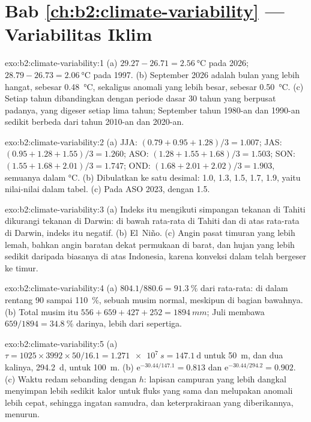 \section*{Bab \ref{ch:b2:climate-variability} --- Variabilitas Iklim}

\begin{solution}{exo:b2:climate-variability:1}
(a) $29.27 - 26.71 = \qty{2.56}{\celsius}$ pada 2026; $28.79 - 26.73 = \qty{2.06}{\celsius}$ pada 1997.
(b) September 2026 adalah bulan yang lebih hangat, sebesar \qty{0.48}{\celsius}, sekaligus anomali yang lebih besar, sebesar
\qty{0.50}{\celsius}. (c) Setiap tahun dibandingkan dengan periode dasar 30 tahun yang berpusat padanya, yang digeser
setiap lima tahun;  September tahun 1980-an dan 1990-an sedikit berbeda dari 
tahun 2010-an dan 2020-an.
\end{solution}

\begin{solution}{exo:b2:climate-variability:2}
(a) JJA: $(0.79 + 0.95 + 1.28)/3 = 1.007$; JAS: $(0.95 + 1.28 + 1.55)/3 = 1.260$; ASO: $(1.28 +
1.55 + 1.68)/3 = 1.503$; SON: $(1.55 + 1.68 + 2.01)/3 = 1.747$; OND: $(1.68 + 2.01 + 2.02)/3 =
1.903$, semuanya dalam \unit{\celsius}. (b) Dibulatkan ke satu desimal: 1.0, 1.3, 1.5, 1.7, 1.9, yaitu nilai-nilai
dalam tabel. (c) Pada ASO 2023, dengan 1.5.
\end{solution}

\begin{solution}{exo:b2:climate-variability:3}
(a) Indeks itu mengikuti simpangan tekanan di Tahiti dikurangi tekanan di Darwin: di bawah rata-rata
di Tahiti dan di atas rata-rata di Darwin, indeks itu negatif. (b) El~Niño. (c) Angin pasat timuran yang lebih lemah, bahkan
angin baratan dekat permukaan di barat, dan hujan yang lebih sedikit daripada biasanya di atas Indonesia, karena
konveksi dalam telah bergeser ke timur.
\end{solution}

\begin{solution}{exo:b2:climate-variability:4}
(a) $804.1/880.6 = \qty{91.3}{\percent}$ dari rata-rata: di dalam rentang 90 sampai \qty{110}{\percent}, sebuah
musim normal, meskipun di bagian bawahnya. (b) Total musim itu $556 + 659 + 427 + 252 =
\qty{1894}{mm}$; Juli membawa $659/1894 = \qty{34.8}{\percent}$ darinya, lebih dari sepertiga.
\end{solution}

\begin{solution}{exo:b2:climate-variability:5}
(a) $\tau = 1025 \times 3992 \times 50/16.1 = \qty{1.271e7}{s} = \qty{147.1}{\day}$ untuk
\qty{50}{m}, dan dua kalinya, \qty{294.2}{\day}, untuk \qty{100}{m}. (b) $\mathrm{e}^{-30.44/147.1} =
0.813$ dan $\mathrm{e}^{-30.44/294.2} = 0.902$. (c) Waktu redam sebanding dengan $h$: lapisan
campuran yang lebih dangkal menyimpan lebih sedikit kalor untuk fluks yang sama dan melupakan anomali lebih cepat, sehingga
ingatan samudra, dan keterprakiraan yang diberikannya, menurun.
\end{solution}


